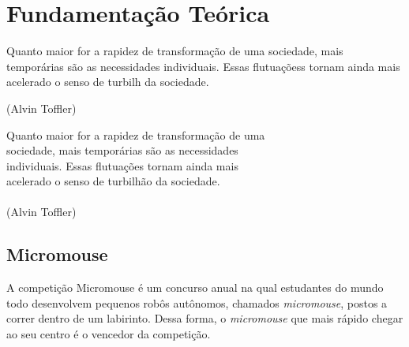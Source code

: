 \chapter{Fundamentação Teórica}
\label{chap:fundteor}

\begin{flushright}

   \begin{list}{}{
      \setlength{\leftmargin}{4.5cm}
      \setlength{\rightmargin}{0cm}
      \setlength{\labelwidth}{0pt}
      \setlength{\labelsep}{\leftmargin}}
      \item Quanto maior for a rapidez de transformação de uma
      sociedade, mais temporárias são as necessidades
      individuais. Essas flutuaçõess tornam ainda mais acelerado
      o senso de turbilh da sociedade.

      \begin{list}{}{
      \setlength{\leftmargin}{0cm}
      \setlength{\rightmargin}{0cm}
      \setlength{\labelwidth}{0pt}
      \setlength{\labelsep}{\leftmargin}}
      \item (Alvin Toffler)
      \end{list}
   \end{list}
\end{flushright}

\begin{flushright}
  Quanto maior for a rapidez de transformação de uma \\
  sociedade, mais temporárias são as necessidades \\
  individuais. Essas flutuações tornam ainda mais \\
  acelerado o senso de turbilhão da sociedade. \\
  \ \\
  (Alvin Toffler)
\end{flushright}

\section{Micromouse}
\label{sec:Micromouse}
\hspace{0.5cm} A competição Micromouse é um concurso anual na qual estudantes do mundo todo desenvolvem pequenos robôs autônomos, chamados \textit{micromouse}, postos a correr dentro de um labirinto. Dessa forma, o \textit{micromouse} que mais rápido chegar ao seu centro é o vencedor da competição.

